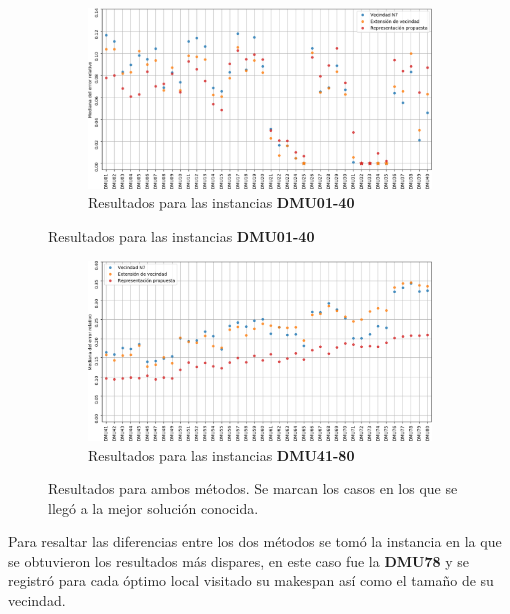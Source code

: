 \begin{figure}[H]
    \begin{subfigure}{\textwidth}
        \centering
        \includegraphics[scale=.6]{Imagenes/prvsn7vsn8err1.png}
        \caption{Resultados para las instancias \textbf{DMU01-40}}
    \end{subfigure}
\end{figure}
\begin{figure}[H]\ContinuedFloat
    \begin{subfigure}{\textwidth}
        \centering
        \includegraphics[scale=.6]{Imagenes/prvsn7vsn8err2.png}
        \caption{Resultados para las instancias \textbf{DMU41-80}}
    \end{subfigure}
    \caption{Resultados para ambos métodos. Se marcan los casos en los que se llegó a la mejor solución conocida.}
\end{figure}


Para resaltar las diferencias entre los dos métodos se tomó la instancia en la que se obtuvieron los resultados más dispares, en este caso fue la \textbf{DMU78} y se registró para cada óptimo local visitado su makespan así como el tamaño de su vecindad.

